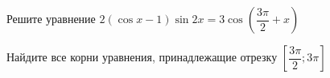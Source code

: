 \begin{ex}
	\begin{condition}
		\begin{enumcols}[label=\asbuk*)]
			\item Решите уравнение \( 2(\cos x - 1) \sin 2x = 3\cos{\left(\dfrac{3\pi}{2} + x\right)} \)
			\item Найдите все корни уравнения, принадлежащие отрезку \( \left[\dfrac{3\pi}{2};3\pi\right] \)
		\end{enumcols}
	\end{condition}
\end{ex}